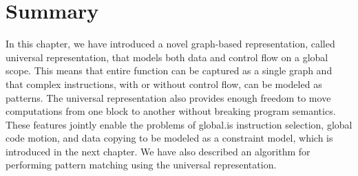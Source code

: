 \section{Summary}

In this chapter, we have introduced a novel graph-based representation, called
\gls{universal representation}, that models both data and control flow on a
global scope.
%
This means that entire \gls{function} can be captured as a single graph and that
complex \glspl{instruction}, with or without control flow, can be modeled as
\glspl{pattern}.
%
The \gls{universal representation} also provides enough freedom to move
computations from one \gls{block} to another without breaking \gls{program}
semantics.
%
These features jointly enable the problems of \gls{global.is} \gls{instruction
  selection}, \gls{global code motion}, and \gls{data copying} to be modeled as
a \gls{constraint model}, which is introduced in the next chapter.
%
We have also described an algorithm for performing \gls{pattern matching} using
the \gls{universal representation}.
